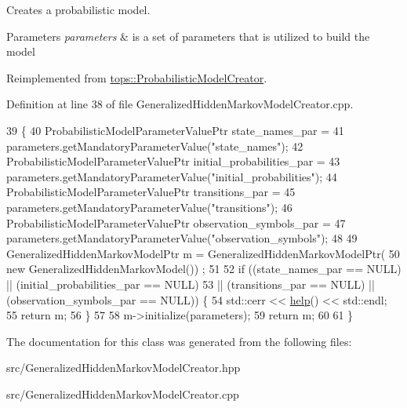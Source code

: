 Creates a probabilistic model. 


\begin{DoxyParams}{Parameters}
{\em parameters} & is a set of parameters that is utilized to build the model \\
\hline
\end{DoxyParams}


Reimplemented from \hyperlink{classtops_1_1ProbabilisticModelCreator_afed6c8ffa45fff446bdaa8b533da8f7c}{tops\+::\+Probabilistic\+Model\+Creator}.



Definition at line 38 of file Generalized\+Hidden\+Markov\+Model\+Creator.\+cpp.


\begin{DoxyCode}
39                                                                                                            
                \{
40     ProbabilisticModelParameterValuePtr state\_names\_par =
41       parameters.getMandatoryParameterValue(\textcolor{stringliteral}{"state\_names"});
42     ProbabilisticModelParameterValuePtr initial\_probabilities\_par =
43       parameters.getMandatoryParameterValue(\textcolor{stringliteral}{"initial\_probabilities"});
44     ProbabilisticModelParameterValuePtr transitions\_par =
45       parameters.getMandatoryParameterValue(\textcolor{stringliteral}{"transitions"});
46     ProbabilisticModelParameterValuePtr observation\_symbols\_par =
47       parameters.getMandatoryParameterValue(\textcolor{stringliteral}{"observation\_symbols"});
48 
49     GeneralizedHiddenMarkovModelPtr m = GeneralizedHiddenMarkovModelPtr(
50                                                                         \textcolor{keyword}{new} GeneralizedHiddenMarkovModel())
      ;
51 
52     \textcolor{keywordflow}{if} ((state\_names\_par == NULL) || (initial\_probabilities\_par == NULL)
53         || (transitions\_par == NULL) || (observation\_symbols\_par == NULL)) \{
54       std::cerr << \hyperlink{classtops_1_1GeneralizedHiddenMarkovModelCreator_a63ce05184acf1030e338198208d470a4}{help}() << std::endl;
55       \textcolor{keywordflow}{return} m;
56     \}
57 
58     m->initialize(parameters);
59     \textcolor{keywordflow}{return} m;
60 
61   \}
\end{DoxyCode}


The documentation for this class was generated from the following files\+:\begin{DoxyCompactItemize}
\item 
src/Generalized\+Hidden\+Markov\+Model\+Creator.\+hpp\item 
src/Generalized\+Hidden\+Markov\+Model\+Creator.\+cpp\end{DoxyCompactItemize}
